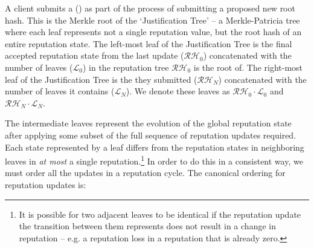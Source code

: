 A client submits a  (\jrh) as part of the process of submitting a proposed new root hash. This is the Merkle root of the `Justification Tree' -- a Merkle-Patricia tree where each leaf represents not a single reputation value, but the root hash of an entire reputation state. The left-most leaf of the Justification Tree is the final accepted reputation state from the last update ($\mathcal{RH}_0$) concatenated with the number of leaves ($\mathcal{L}_0$) in the reputation tree $\mathcal{RH}_0$ is the root of. The right-most leaf of the Justification Tree is the  they submitted ($\mathcal{RH}_N$) concatenated with the number of leaves it contains ($\mathcal{L}_N$). We denote these leaves as $\mathcal{RH}_0 \cdot \mathcal{L}_0$ and $\mathcal{RH}_N \cdot \mathcal{L}_N$.

The intermediate leaves represent the evolution of the global reputation state after applying some subset of the full sequence of reputation updates required. Each state represented by a leaf differs from the reputation states in neighboring leaves in \textit{at most} a single reputation.\footnote{It is possible for two adjacent leaves to be identical if the reputation update the transition between them represents does not result in a change in reputation -- e.g. a reputation loss in a reputation that is already zero.} In order to do this in a consistent way, we must order all the updates in a reputation cycle. The canonical ordering for reputation updates is:

